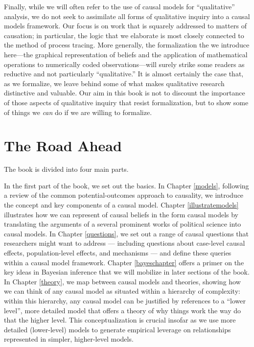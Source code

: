 \documentclass[
  12pt,
]{book}
\begin{document}
Finally, while we will often refer to the use of causal models for ``qualitative'' analysis, we do not seek to assimilate all forms of qualitative inquiry into a causal models framework. Our focus is on work that is squarely addressed to matters of causation; in particular, the logic that we elaborate is most closely connected to the method of process tracing. More generally, the formalization the we introduce here---the graphical representation of beliefs and the application of mathematical operations to numerically coded observations---will surely strike some readers as reductive and not particularly ``qualitative.'' It is almost certainly the case that, as we formalize, we leave behind some of what makes qualitative research distinctive and valuable. Our aim in this book is not to discount the importance of those aspects of qualitative inquiry that resist formalization, but to show some of things we \emph{can} do if we are willing to formalize.

\hypertarget{the-road-ahead}{%
\section{The Road Ahead}\label{the-road-ahead}}

The book is divided into four main parts.

In the first part of the book, we set out the basics. In Chapter \ref{models}, following a review of the common potential-outcomes approach to causality, we introduce the concept and key components of a causal model. Chapter \ref{illustratemodels} illustrates how we can represent of causal beliefs in the form causal models by translating the arguments of a several prominent works of political science into causal models. In Chapter \ref{questions}, we set out a range of causal questions that researchers might want to address --- including questions about case-level causal effects, population-level effects, and mechanisms --- and define these queries within a causal model framework. Chapter \ref{bayeschapter} offers a primer on the key ideas in Bayesian inference that we will mobilize in later sections of the book. In Chapter \ref{theory}, we map between causal models and theories, showing how we can think of any causal model as situated within a hierarchy of complexity: within this hierarchy, any causal model can be justified by references to a ``lower level'', more detailed model that offers a theory of why things work the way do that the higher level. This conceptualization is crucial insofar as we use more detailed (lower-level) models to generate empirical leverage on relationships represented in simpler, higher-level models.
\end{document}
